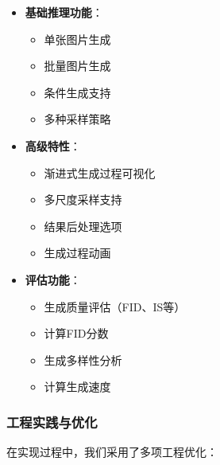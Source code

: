 \documentclass{ctexart}
\begin{document}
\begin{itemize}
    \item \textbf{基础推理功能}：
    \begin{itemize}
        \item 单张图片生成
        \item 批量图片生成
        \item 条件生成支持
        \item 多种采样策略
    \end{itemize}
    
    \item \textbf{高级特性}：
    \begin{itemize}
        \item 渐进式生成过程可视化
        \item 多尺度采样支持
        \item 结果后处理选项
        \item 生成过程动画
    \end{itemize}
    
    \item \textbf{评估功能}：
    \begin{itemize}
        \item 生成质量评估（FID、IS等）
        \item 计算FID分数
        \item 生成多样性分析
        \item 计算生成速度
    \end{itemize}
\end{itemize}

\subsubsection{工程实践与优化}
\noindent
在实现过程中，我们采用了多项工程优化：
\end{document}
